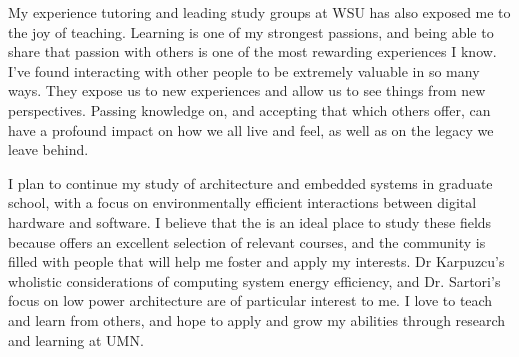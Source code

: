 My experience tutoring and leading study groups at WSU has also exposed me to the joy of teaching. Learning
is one of my strongest passions, and being able to share that passion with others is one of the 
most rewarding experiences I know. I've found interacting with other people to be extremely valuable in so many ways.
They expose us to new experiences and allow us to see things from new perspectives. Passing knowledge on,
and accepting that which others offer, can have a profound impact on how we all live and feel, as well as on the legacy
we leave behind. 

I plan to continue my study of architecture and embedded systems in graduate school, with a focus on
environmentally efficient interactions between digital hardware and software. I believe that the \university
is an ideal place to study these fields because \uni offers an excellent selection of relevant courses, 
and the community is filled with people that will help me foster and apply my interests. Dr Karpuzcu's wholistic considerations of computing system energy efficiency, and Dr. Sartori's focus on low power architecture are of particular interest to me. 
I love to teach and learn from others, and hope to apply and grow my abilities through research and learning at UMN.


